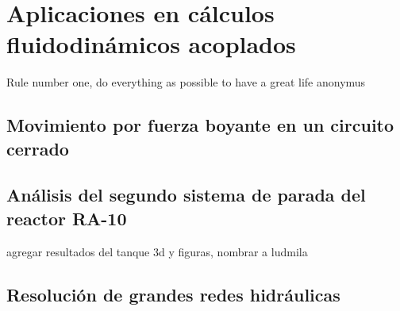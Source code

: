 \chapter{Aplicaciones en cálculos fluidodinámicos acoplados}
\label{chap4}
\chapterquote
{Rule number one, do everything as possible to have a great life}
{anonymus}

\section{Movimiento por fuerza boyante en un circuito cerrado}
\label{4:ff}

\section{Análisis del segundo sistema de parada del reactor RA-10}
\label{4:ra10}

agregar resultados del tanque 3d y figuras, nombrar a ludmila

\section{Resolución de grandes redes hidráulicas}
\label{4:redes}
